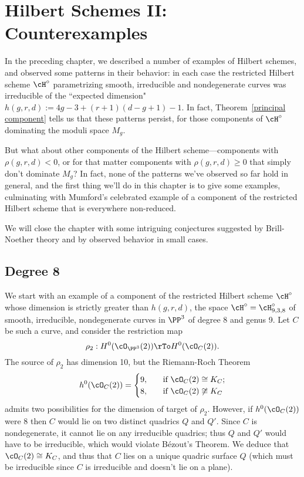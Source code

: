 
\chapter{Hilbert Schemes II: Counterexamples} 
\label{HilbertSchemesCounterexamplesChapter}


In the preceding chapter, we described a number of examples of Hilbert schemes, and observed some patterns in their behavior: in each case the restricted Hilbert scheme $\cH^\circ$ parametrizing smooth, irreducible and nondegenerate curves was irreducible of the ``expected dimension" $h(g,r,d) :=  4g-3 + (r+1)(d-g+1) - 1$. In fact, Theorem~\ref{principal component} tells us that these patterns persist, for those components of $\cH^\circ$ dominating the moduli space $M_g$.

But what about other components of the Hilbert scheme---components with $\rho(g,r,d) < 0$, or for that matter components with $\rho(g,r,d) \geq 0$ that simply don't dominate $M_g$? In fact, none of the patterns we've observed so far hold in general, and the first thing we'll do in this chapter is to give some examples, culminating with Mumford's celebrated example of a component of the restricted Hilbert scheme that is everywhere non-reduced.

We will close the chapter with some intriguing conjectures suggested by Brill-Noether theory and by observed behavior in small cases.

\section{Degree 8}\label{degree 8 section}

We start with an example of a component of the restricted Hilbert scheme $\cH^\circ$ whose dimension is strictly greater than $h(g,r,d)$, the space $\cH^\circ = \cH^\circ_{9,3,8}$ of smooth, irreducible, nondegenerate curves in $\PP^3$ of degree 8 and genus 9. Let $C$ be such a curve, and consider the restriction map
$$
\rho_2 : H^0(\cO_{\PP^3}(2)) \rTo H^0(\cO_C(2)).
$$
The source of $\rho_2$ has dimension 10, but the Riemann-Roch Theorem
\begin{align*}
h^0(\cO_C(2)) =
\begin{cases}
9, \quad &\text{if } \cO_C(2) \cong K_C; \\
8,  \quad &\text{if } \cO_C(2) \not\cong K_C
\end{cases}
\end{align*}
admits two possibilities for the dimension of target of $\rho_2$.
However, if $h^0(\cO_C(2))$ were 8 then $C$ would  lie on two distinct quadrics $Q$ and $Q'$. Since $C$ is nondegenerate, it cannot lie on any irreducible quadrics; thus $Q$ and $Q'$ would have to be irreducible, which would violate B\'ezout's Theorem. We deduce that $\cO_C(2) \cong K_C$, and thus that $C$ lies on a unique quadric surface $Q$ (which must be irreducible since $C$ is irreducible and doesn't lie on a plane).

